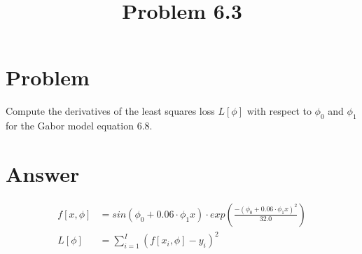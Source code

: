 \documentclass{article}
\title{Problem 6.3}
\begin{document}
\section{Problem}

Compute the derivatives of the least squares loss $ L [ \phi ] $  with respect to $ \phi_0 $ and $\phi_1$ for the Gabor model equation 6.8. 

\section{Answer}

\begin{align}
    f[x,\phi] &= sin(\phi_0 + 0.06 \cdot \phi_1x) \cdot exp  \left( \frac{-(\phi_0 + 0.06 \cdot \phi_1x)^2}{32.0} \right)
    \\
    L[\phi]   &= \sum_{i=1}^{I} (f[x_i, \phi]-y_i)^2
\end{align}
\end{document}
